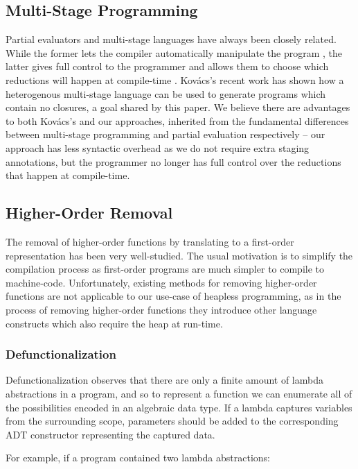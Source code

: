 \documentclass[runningheads]{llncs}
\begin{document}
\subsection{Multi-Stage Programming}

Partial evaluators and multi-stage languages have always been closely related. While the former lets the compiler automatically manipulate the program \cite{jones1996introduction}, the latter gives full control to the programmer and allows them to choose which reductions will happen at compile-time \cite{taha2004gentle}. Kovács's recent work \cite{kovacs2024closure} has shown how a heterogenous multi-stage language can be used to generate programs which contain no closures, a goal shared by this paper. We believe there are advantages to both Kovács's and our approaches, inherited from the fundamental differences between multi-stage programming and partial evaluation respectively -- our approach has less syntactic overhead as we do not require extra staging annotations, but the programmer no longer has full control over the reductions that happen at compile-time.

\subsection{Higher-Order Removal}

The removal of higher-order functions by translating to a first-order representation has been very well-studied. The usual motivation is to simplify the compilation process as first-order programs are much simpler to compile to machine-code. Unfortunately, existing methods for removing higher-order functions are not applicable to our use-case of heapless programming, as in the process of removing higher-order functions they introduce other language constructs which also require the heap at run-time.

\subsubsection{Defunctionalization}

Defunctionalization observes that there are only a finite amount of lambda abstractions in a program, and so to represent a function we can enumerate all of the possibilities encoded in an algebraic data type. If a lambda captures variables from the surrounding scope, parameters should be added to the corresponding ADT constructor representing the captured data.

For example, if a program contained two lambda abstractions:
\end{document}
